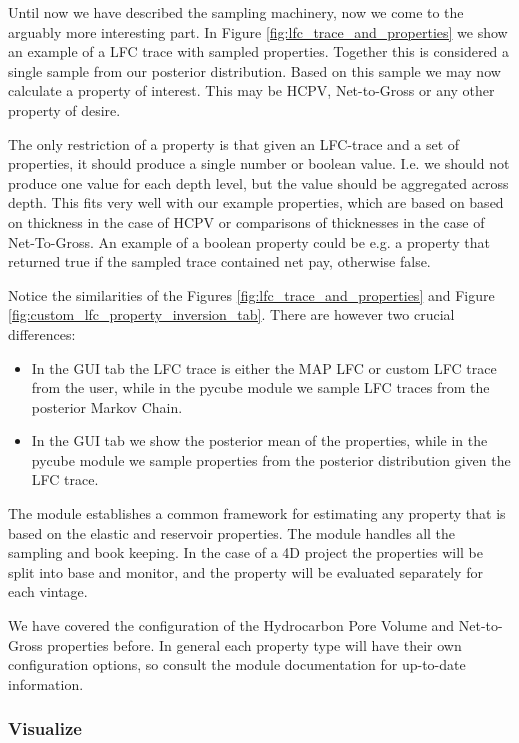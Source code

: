 \documentclass[note,screen,english,12pt,utf8]{nrdoc}
\begin{document}
Until now we have described the sampling machinery, now we come to the arguably
more interesting part. In Figure \ref{fig:lfc_trace_and_properties} we show an
example of a LFC trace with sampled properties. Together this is considered
a single sample from our posterior distribution. Based on this sample we may
now calculate a property of interest. This may be HCPV, Net-to-Gross or any
other property of desire.

The only restriction of a property is that given an LFC-trace and a set of
properties, it should produce a single number or boolean value. I.e. we
should not produce one value for each depth level, but the value should
be aggregated across depth. This fits very well with our example properties,
which are based on based on thickness in the case of HCPV or comparisons of
thicknesses in the case of Net-To-Gross. An example of a boolean property
could be e.g. a property that returned true if the sampled trace contained
net pay, otherwise false.

Notice the similarities of the Figures \ref{fig:lfc_trace_and_properties} and
Figure \ref{fig:custom_lfc_property_inversion_tab}. There are however two
crucial differences:
\begin{itemize}
    \item In the GUI tab the LFC trace is either the MAP LFC or custom LFC trace
          from the user, while in the pycube module we sample LFC traces
          from the posterior Markov Chain.
    \item In the GUI tab we show the posterior mean of the properties,
          while in the pycube module we sample properties from the posterior
          distribution given the LFC trace.
\end{itemize}

The module establishes a common framework for estimating any property that
is based on the elastic and reservoir properties. The module handles all the
sampling and book keeping. In the case of a 4D project the properties will
be split into base and monitor, and the property will be evaluated separately
for each vintage.

We have covered the configuration of the Hydrocarbon Pore Volume and
Net-to-Gross properties before. In general each property type will
have their own configuration options, so consult the module documentation
for up-to-date information.

\subsubsection{Visualize}
\end{document}
